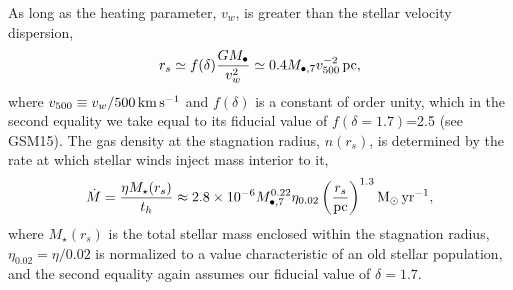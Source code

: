\documentclass[usenatbib,fleqn]{mnras}
\newcommand{\Mbh}[1][]{M_{\bullet#1}}
\newcommand{\Msun}{{\rm M_\odot}}
\newcommand{\rs}{r_s}
\begin{document}
As long as the heating parameter, $v_w$, is greater than the stellar
velocity dispersion,
\begin{align}
r_s \simeq f(\delta) \frac{G M_{\bullet}}{v_w^2}
  \simeq 0.4 \Mbh[,7] v_{500}^{-2} \,{\rm pc},
\label{eq:rs}
\end{align}
%
where $v_{500}\equiv v_w/500 \,{\rm km\, s^{-1}}$ and $f(\delta)$ is a
constant of order unity, which in the second equality we take equal to
its fiducial value of $f(\delta = 1.7)$=2.5 (see GSM15). The gas density at the
stagnation radius, $n(\rs)$, is determined by the rate at which
stellar winds inject mass interior to it,
\begin{equation}
  \dot{M}=\frac{\eta M_{\rm \star}(\rs)}{t_h} \approx  2.8 \times 10^{-6} \Mbh[,7]^{0.22} \eta_{0.02} \left(\frac{r_s}{\rm
      pc}\right)^{1.3} \Msun \, {\rm yr}^{-1},
\label{eq:dotM}
\end{equation}
%
where $M_{\star}(\rs)$ is the total stellar mass enclosed within the
stagnation radius, $\eta_{0.02}=\eta/0.02$ is normalized to a value
characteristic of an old stellar population, and the second equality
again assumes our fiducial value of $\delta=1.7$.
\end{document}
